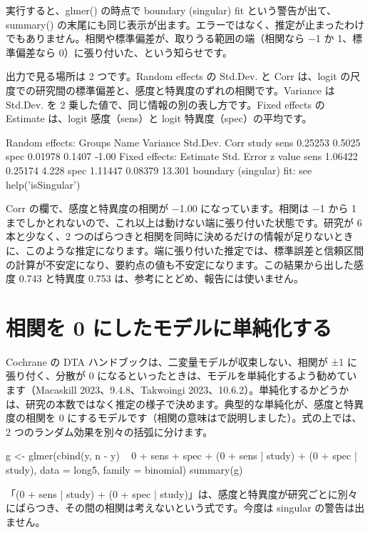 実行すると、glmer() の時点で boundary (singular) fit という警告が出て、summary() の末尾にも同じ表示が出ます。エラーではなく、推定が止まったわけでもありません。相関や標準偏差が、取りうる範囲の端（相関なら −1 か 1、標準偏差なら 0）に張り付いた、という知らせです。

出力で見る場所は 2 つです。Random effects の Std.Dev. と Corr は、logit の尺度での研究間の標準偏差と、感度と特異度のずれの相関です。Variance は Std.Dev. を 2 乗した値で、同じ情報の別の表し方です。Fixed effects の Estimate は、logit 感度（sens）と logit 特異度（spec）の平均です。

\begin{rout}
Random effects:
 Groups Name Variance Std.Dev. Corr
 study  sens 0.25253  0.5025
        spec 0.01978  0.1407   -1.00
Fixed effects:
     Estimate Std. Error z value
sens  1.06422    0.25174   4.228
spec  1.11447    0.08379  13.301
boundary (singular) fit: see help('isSingular')
\end{rout}

Corr の欄で、感度と特異度の相関が −1.00 になっています。相関は −1 から 1 までしかとれないので、これ以上は動けない端に張り付いた状態です。研究が 6 本と少なく、2 つのばらつきと相関を同時に決めるだけの情報が足りないときに、このような推定になります。端に張り付いた推定では、標準誤差と信頼区間の計算が不安定になり、要約点の値も不安定になります。この結果から出した感度 0.743 と特異度 0.753 は、参考にとどめ、報告には使いません。

\section{相関を 0 にしたモデルに単純化する}
\label{sec:13-4}

Cochrane の DTA ハンドブックは、二変量モデルが収束しない、相関が ±1 に張り付く、分散が 0 になるといったときは、モデルを単純化するよう勧めています（Macaskill 2023、9.4.8、Takwoingi 2023、10.6.2）。単純化するかどうかは、研究の本数ではなく推定の様子で決めます。典型的な単純化が、感度と特異度の相関を 0 にするモデルです（相関の意味はで説明しました）。式の上では、2 つのランダム効果を別々の括弧に分けます。

\begin{rcode}
g <- glmer(cbind(y, n - y) ~ 0 + sens + spec +
             (0 + sens | study) + (0 + spec | study),
           data = long5, family = binomial)
summary(g)
\end{rcode}

「(0 + sens | study) + (0 + spec | study)」は、感度と特異度が研究ごとに別々にばらつき、その間の相関は考えないという式です。今度は singular の警告は出ません。

